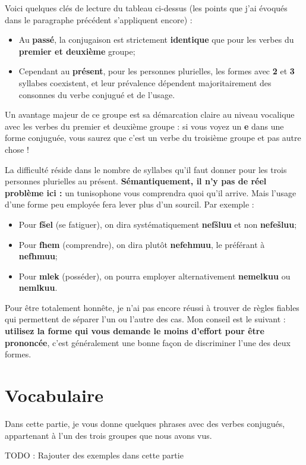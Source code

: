 Voici quelques clés de lecture du tableau ci-dessus (les points que j'ai évoqués dans le paragraphe précédent s'appliquent encore) :

\begin{itemize}
    \item Au \textbf{passé}, la conjugaison est strictement \textbf{identique} que pour les verbes du \textbf{premier et deuxième} groupe;
    \item Cependant au \textbf{présent}, pour les personnes plurielles, les formes avec \textbf{2} et \textbf{3} syllabes coexistent, et leur prévalence dépendent majoritairement des consonnes du verbe conjugué et de l'usage. 
\end{itemize}

Un avantage majeur de ce groupe est sa démarcation claire au niveau vocalique avec les verbes du premier et deuxième groupe : si vous voyez un \textbf{e} dans une forme conjuguée, vous saurez que c'est un verbe du troisième groupe et pas autre chose ! 

La difficulté réside dans le nombre de syllabes qu'il faut donner pour les trois personnes plurielles au présent. \textbf{Sémantiquement, il n'y pas de réel problème ici :} un tunisophone vous comprendra quoi qu'il arrive. Mais l'usage d'une forme peu employée fera lever plus d'un sourcil. Par exemple :
 \begin{itemize}
     \item Pour \textbf{f\v{s}el} (se fatiguer), on dira systématiquement \textbf{nef\v{s}luu} et non \textbf{nefe\v{s}luu};
     \item Pour \textbf{fhem} (comprendre), on dira plutôt \textbf{nefehmuu}, le préférant à \textbf{nefhmuu};
     \item Pour \textbf{mlek} (posséder), on pourra employer alternativement \textbf{nemelkuu} ou \textbf{nemlkuu}.
 \end{itemize}

Pour être totalement honnête, je n'ai pas encore réussi à trouver de règles fiables qui permettent de séparer l'un ou l'autre des cas. Mon conseil est le suivant : \textbf{utilisez la forme qui vous demande le moins d'effort pour être prononcée}, c'est généralement une bonne façon de discriminer l'une des deux formes.

\section*{Vocabulaire}
Dans cette partie, je vous donne quelques phrases avec des verbes conjugués, appartenant à l'un des trois groupes que nous avons vus. 

TODO : Rajouter des exemples dans cette partie 
